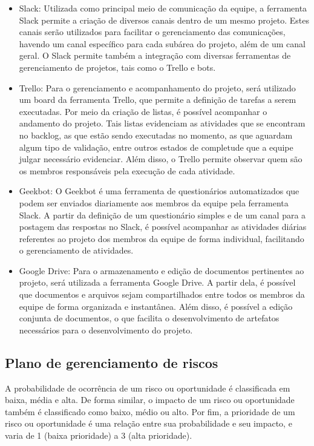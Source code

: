 \begin{itemize}
	\item Slack: Utilizada como principal meio de comunicação da equipe, a ferramenta Slack permite a criação de diversos canais dentro de um mesmo projeto. Estes canais serão utilizados para facilitar o gerenciamento das comunicações, havendo um canal específico para cada subárea do projeto, além de um canal geral. O Slack permite também a integração com diversas ferramentas de gerenciamento de projetos, tais como o Trello e bots.
	
	\item Trello: Para o gerenciamento e acompanhamento do projeto, será utilizado um board da ferramenta Trello, que permite a definição de tarefas a serem executadas. Por meio da criação de listas, é possível acompanhar o andamento do projeto. Tais listas evidenciam as atividades que se encontram no backlog, as que estão sendo executadas no momento, as que aguardam algum tipo de validação, entre outros estados de completude que a equipe julgar necessário evidenciar. Além disso, o Trello permite observar quem são os membros responsáveis pela execução de cada atividade.
	
	\item Geekbot: O Geekbot é uma ferramenta de questionários automatizados que podem ser enviados diariamente aos membros da equipe pela ferramenta Slack. A partir da definição de um questionário simples e de um canal para a postagem das respostas no Slack, é possível acompanhar as atividades diárias referentes ao projeto dos membros da equipe de forma individual, facilitando o gerenciamento de atividades. 
	
	\item Google Drive: Para o armazenamento e edição de documentos pertinentes ao projeto, será utilizada a ferramenta Google Drive. A partir dela, é possível que documentos e arquivos sejam compartilhados entre todos os membros da equipe de forma organizada e instantânea. Além disso, é possível a edição conjunta de documentos, o que facilita o desenvolvimento de artefatos necessários para o desenvolvimento do projeto.
	
\end{itemize}

\subsection{Plano de gerenciamento de riscos}

A probabilidade de ocorrência de um risco ou oportunidade é classificada em baixa, média e alta. De forma similar, o impacto de um risco ou oportunidade também é classificado como baixo, médio ou alto. Por fim, a prioridade de um risco ou oportunidade é uma relação entre sua probabilidade e seu impacto, e varia de 1 (baixa prioridade) a 3 (alta prioridade).


